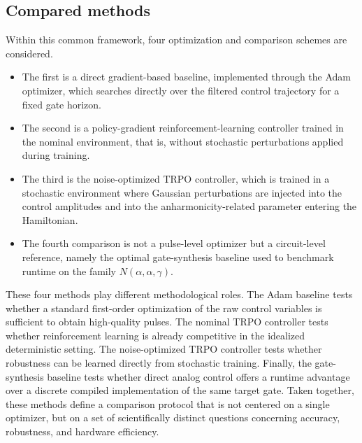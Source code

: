 \subsection{Compared methods}
Within this common framework, four optimization and comparison schemes are considered.
\begin{itemize}
    \item The first is a direct gradient-based baseline, implemented through the Adam optimizer, which searches directly over the filtered control trajectory for a fixed gate horizon.
    \item The second is a policy-gradient reinforcement-learning controller trained in the nominal environment, that is, without stochastic perturbations applied during training.
    \item The third is the noise-optimized TRPO controller, which is trained in a stochastic environment where Gaussian perturbations are injected into the control amplitudes and into the anharmonicity-related parameter entering the Hamiltonian.
    \item The fourth comparison is not a pulse-level optimizer but a circuit-level reference, namely the optimal gate-synthesis baseline used to benchmark runtime on the family \(N(\alpha,\alpha,\gamma)\).
\end{itemize}
These four methods play different methodological roles. The Adam baseline tests whether a standard first-order optimization of the raw control variables is sufficient to obtain high-quality pulses. The nominal TRPO controller tests whether reinforcement learning is already competitive in the idealized deterministic setting. The noise-optimized TRPO controller tests whether robustness can be learned directly from stochastic training. Finally, the gate-synthesis baseline tests whether direct analog control offers a runtime advantage over a discrete compiled implementation of the same target gate. Taken together, these methods define a comparison protocol that is not centered on a single optimizer, but on a set of scientifically distinct questions concerning accuracy, robustness, and hardware efficiency.

